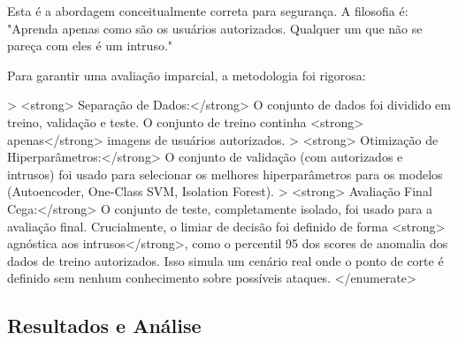 \documentclass[a4paper,12pt]{article}
\begin{document}
\begin{itemize}
Esta é a abordagem conceitualmente correta para segurança. A filosofia é: "Aprenda apenas como são os usuários autorizados. Qualquer um que não se pareça com eles é um intruso."

Para garantir uma avaliação imparcial, a metodologia foi rigorosa:
\begin{enumerate}
    > <strong> Separação de Dados:</strong> O conjunto de dados foi dividido em treino, validação e teste. O conjunto de treino continha <strong> apenas</strong> imagens de usuários autorizados.
    > <strong> Otimização de Hiperparâmetros:</strong> O conjunto de validação (com autorizados e intrusos) foi usado para selecionar os melhores hiperparâmetros para os modelos (Autoencoder, One-Class SVM, Isolation Forest).
    > <strong> Avaliação Final Cega:</strong> O conjunto de teste, completamente isolado, foi usado para a avaliação final. Crucialmente, o limiar de decisão foi definido de forma <strong> agnóstica aos intrusos</strong>, como o percentil 95 dos scores de anomalia dos dados de treino autorizados. Isso simula um cenário real onde o ponto de corte é definido sem nenhum conhecimento sobre possíveis ataques.
</enumerate>

\subsection{Resultados e Análise}

\begin{table}[h!]
\centering
\caption{A8 — Métricas de controle de acesso (classificação unária): média <strong> </strong> desvio padrão.}
\label{tab:a8_unario}
\end{table}


\end{enumerate}
\end{itemize}
\end{document}
